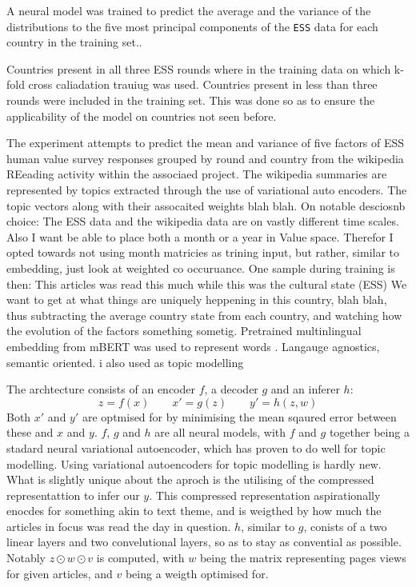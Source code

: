 A neural model was trained to predict the average and the variance of the distributions to the five most principal components of the \texttt{ESS} data for each country in the training set..

Countries present in all three ESS rounds where in the training data on which k-fold cross caliadation trauiug was used.
Countries present in less than three rounds were included in the training set. This was done so as to
ensure the applicability of the model on countries not seen before.

The experiment attempts to predict the mean and variance of five factors of ESS human value survey responses grouped by round and country from the wikipedia REeading activity within the associaed project.
The wikipedia summaries are represented by topics extracted through the use of variational auto encoders. The topic vectors along with their assocaited weights blah blah.
On notable desciosnb choice: The ESS data and the wikipedia data are on vastly different time scales. Also I want be able to place both a month or a year in Value space. Therefor I opted towards not using month matricies as trining input, but rather, similar to embedding, just look at weighted co occuruance. One sample during training is then: This articles was read this much while this was the cultural state (ESS)
We want to get at what things are uniquely heppening in this country, blah blah, thus subtracting the average country state from each country, and watching how the evolution of the factors something sometig.
Pretrained multinlingual embedding from mBERT was used to represent words \cite{artetxe-etal-2017-learning}. Langauge agnostics, semantic oriented.
\cite{kingma2013auto} i also used as topic modelling
\cite{DBLP:journals/corr/abs-1810-04805}
\cite{Wu2020}

The archtecture consists of an encoder $f$, a decoder $g$ and an inferer $h$:
$$
z  = f(x) \qquad
x' = g(z) \qquad
y' = h(z, w)
$$
Both $x'$ and $y'$ are optmised for by minimising the mean sqaured error between these and $x$ and $y$.
$f$, $g$ and $h$ are all neural models, with $f$ and $g$ together being a stadard neural variational autoencoder, which has proven to do well for topic modelling.
Using variational autoencoders for topic modelling is hardly new. What is slightly unique about the aproch is the utilising of the compressed representattion to infer our $y$.
This compressed representation aspirationally enocdes for something akin to text theme, and is weigthed by how much the articles in focus was read the day in question.
$h$, similar to $g$, conists of a two linear layers and two convelutional layers, so as to stay as convential as possible.
Notably $z \odot w \odot v$ is computed, with $w$ being the matrix representing pages views for given articles, and $v$ being a weigth optimised for.

